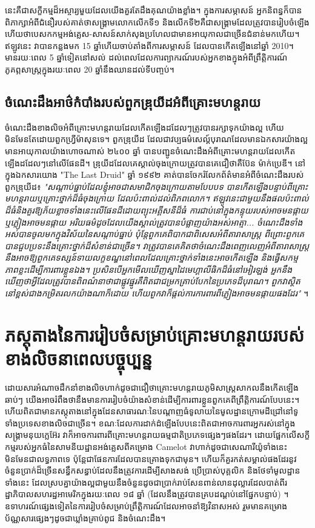\documentclass[10pt,twocolumn,letterpaper]{article}
\begin{document}
នេះគឺជាសក្ខីកម្មដ៏អស្ចារ្យមួយដែលយើងគួរតែដឹងគុណយ៉ាងខ្លាំង។ ក្នុងការសម្ភាសន៍ អ្នកនិពន្ធក៏បានពិភាក្សាអំពីជំនឿរបស់គាត់ថាសង្គ្រាមលោកលើកទី១ និងលើកទី២គឺជាសង្គ្រាមដែលត្រូវបានរៀបចំឡើង ហើយថាបេសកកម្មអង់គ្លេស-សាសន៍សាក់សុងប្រហែលជាមានអាយុកាលជាច្រើនជំនាន់មកហើយ។ ឥឡូវនេះ វាបានកន្លងមក 15 ឆ្នាំហើយចាប់តាំងពីការសម្ភាសន៍ ដែលបានកើតឡើងនៅឆ្នាំ 2010។ មានរយៈពេល 5 ឆ្នាំទៀតនៅសល់ ដល់ពេលដែលការព្យាករណ៍របស់អ្នកខាងក្នុងអំពីព្រឹត្តិការណ៍ភូគព្ភសាស្ត្រក្នុងរយៈពេល 20 ឆ្នាំនឹងឈានដល់ទីបញ្ចប់។
\subsection{ចំណេះដឹងអាថ៌កំបាំងរបស់ពួកឌ្រុយីដអំពីគ្រោះមហន្តរាយ}

ចំណេះដឹងខាងលិចអំពីគ្រោះមហន្តរាយដែលកើតឡើងដដែលៗត្រូវបានរក្សាទុកយ៉ាងល្អ ហើយមិនមែនតែដោយពួកហ្វ្រីម៉ាសុនទេ។ ពួកឌ្រុយីដ ដែលជាវប្បធម៌សេល្ត៍បុរាណដែលមានឯកសារយ៉ាងល្អ មានអាយុកាលយ៉ាងហោចណាស់ ២៤០០ ឆ្នាំ \cite{7} បានបញ្ជូនចំណេះដឹងអំពីគ្រោះមហន្តរាយដែលកើតឡើងដដែលៗនៅលើផែនដី។ ឌ្រុយីដដែលគេស្គាល់ចុងក្រោយត្រូវបានគេជឿថាគឺប៊ែន ម៉ាក់ប្រេឌី។ នៅក្នុងឯកសារយោង "The Last Druid" ឆ្នាំ ១៩៩២ គាត់បានចែករំលែកព័ត៌មានអំពីចំណេះដឹងរបស់ពួកឌ្រុយីដ៖ \textit{"សណ្តាប់ធ្នាប់ដែលខ្ញុំអាចជាសមាជិកចុងក្រោយតាមបែបបទ បានកើតឡើងបន្ទាប់ពីគ្រោះមហន្តរាយឬគ្រោះថ្នាក់ដ៏ធំចុងក្រោយ ដែលប៉ះពាល់ដល់ពិភពលោក។ ឥឡូវនេះជាមួយនឹងផលប៉ះពាល់ដ៏ធំនិងគួរឱ្យភ័យខ្លាចទាំងនេះលើផែនដីដោយព្យុះអគ្គីសនីដ៏ធំ ការជាប់នៅក្នុងកន្ទុយរបស់អាចមនផ្កាយ ឬភ្លៀងអាចមនផ្កាយ អរិយធម៌ដូចដែលយើងស្គាល់ត្រូវបានបំផ្លាញយ៉ាងអស់អាត្មា... ចំណេះដឹងទាំងអស់បានចូលមកក្នុងវិស័យនៃសណ្តាប់ធ្នាប់ ប៉ុន្តែពួកគេពិបាកជាពិសេសអំពីតារាសាស្ត្រ ពីព្រោះពួកគេបានជួបប្រទះនឹងគ្រោះថ្នាក់ដ៏សំខាន់ជាច្រើន។ វាត្រូវបានគេគិតថាចំណេះដឹងពេញលេញអំពីតារាសាស្ត្រនឹងអាចឱ្យពួកគេទស្សន៍ទាយលក្ខខណ្ឌនៅពេលដែលគ្រោះថ្នាក់ទាំងនេះអាចកើតឡើង និងធ្វើសកម្មភាពខ្លះដើម្បីការពារខ្លួនឯង។ ប្រសិនបើអ្នកមើលឃើញស្នាដៃមេហ្គាលីធិកដ៏ធំនៅអៀរឡង់ អ្នកនឹងឃើញថាអ្វីដែលត្រូវបានពិពណ៌នាថាជាផ្លូវផ្នូរគឺពិតជាជម្រកគ្រាប់បែកនៃប្រភេទដ៏បុរាណ។ ពួកវាស្ថិតនៅខ្ពស់ជាងកម្រិតរលកយ៉ាងណាក៏ដោយ ហើយពួកវាក៏ផ្តល់ការការពារពីភ្លៀងអាចមនផ្កាយផងដែរ"} \cite{8,9}។

\section{ភស្តុតាងនៃការរៀបចំសម្រាប់គ្រោះមហន្តរាយរបស់ខាងលិចនាពេលបច្ចុប្បន្ន}

ដោយសារអំណាចដឹកនាំខាងលិចហាក់ដូចជាជឿថាគ្រោះមហន្តរាយភូមិសាស្ត្រសាកលនឹងកើតឡើងឆាប់ៗ យើងអាចរំពឹងថានឹងមានការរៀបចំយ៉ាងសំខាន់ដើម្បីការពារខ្លួនពួកគេពីព្រឹត្តិការណ៍បែបនេះ។ ហើយពិតជាមានភស្តុតាងនៅក្នុងដែនសាធារណៈនៃបណ្តាញធំទូលាយនៃមូលដ្ឋានក្រោមដីជ្រៅនៅទូទាំងប្រទេសខាងលិចជាច្រើន។ ខណៈដែលការដាក់ដំឡើងបែបនេះពិតជាអាចការពារអ្នករស់នៅក្នុងសង្គ្រាមនុយក្លេអ៊ែរ វាក៏អាចការពារពីគ្រោះមហន្តរាយធម្មជាតិប្រភេទផ្សេងៗផងដែរ។ ដោយផ្អែកលើសក្ខីកម្មរបស់អ្នកធំនៃសាមនីយដ្ឋានអង់គ្លេសពីគម្រោង Camelot \cite{4,6} វាហាក់ដូចជាសេណារីយ៉ូទាំងនេះមិនមែនជាលទ្ធភាពទេ ប៉ុន្តែជាផែនការដែលបានគ្រោងទុកជាមុន។ ហើយក៏គួរកត់សម្គាល់ផងដែរនូវចំនួនប្រាក់ដ៏ច្រើនសន្ធឹកសន្ធាប់ដែលនឹងត្រូវការដើម្បីសាងសង់ ប្រើប្រាស់បុគ្គលិក និងថែទាំមូលដ្ឋានទាំងនេះ ដែលស្របគ្នាយ៉ាងល្អជាមួយនឹងចំនួនដូចជាប្រាក់រាប់សែនពាន់លានដុល្លារដែលបាត់ពីរដ្ឋាភិបាលសហរដ្ឋអាមេរិកក្នុងរយៈពេល ១៨ ឆ្នាំ (ដែលនឹងត្រូវបានគ្របដណ្តប់នៅផ្នែកបន្ទាប់) \cite{11,12,13}។ ឧទាហរណ៍ផ្សេងទៀតនៃការរៀបចំសម្រាប់ព្រឹត្តិការណ៍ដែលអាចនាំឱ្យវិនាសអស់ រួមមានគម្រោងប័ណ្ណសារផ្សេងៗដូចជាឃ្លាំងគ្រាប់ពូជ និងចំណេះដឹង។
\end{document}
